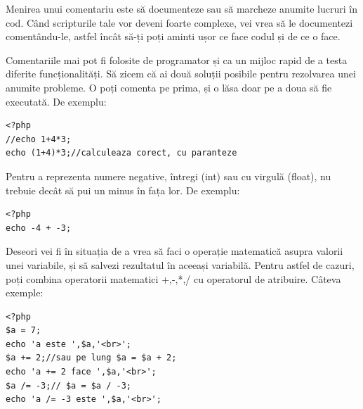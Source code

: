 Menirea unui comentariu este să documenteze sau să marcheze
anumite lucruri în cod. Când scripturile tale vor deveni foarte complexe,
vei vrea să le documentezi comentându-le, astfel încât să-ți
poți aminti ușor ce face codul și de ce o face.


Comentariile mai pot fi folosite de programator
și ca un mijloc rapid de a testa diferite funcționalități.
Să zicem că ai două soluții posibile pentru rezolvarea
unei anumite probleme. O poți comenta pe prima, și
o lăsa doar pe a doua să fie executată. De exemplu:

\begin{lstlisting}
<?php
//echo 1+4*3;
echo (1+4)*3;//calculeaza corect, cu paranteze
\end{lstlisting}

Pentru a reprezenta numere negative, întregi (int)
sau cu virgulă (float), nu trebuie decât să pui un
minus în fața lor. De exemplu:

\begin{lstlisting}
<?php
echo -4 + -3;
\end{lstlisting}

Deseori vei fi în situația de a vrea
să faci o operație matematică
asupra valorii unei variabile,
și să salvezi rezultatul în aceeași variabilă.
Pentru astfel de cazuri, poți combina operatorii
matematici +,-,*,/ cu operatorul de atribuire. Câteva
exemple:
\begin{lstlisting}
<?php
$a = 7;
echo 'a este ',$a,'<br>';
$a += 2;//sau pe lung $a = $a + 2;
echo 'a += 2 face ',$a,'<br>';
$a /= -3;// $a = $a / -3;
echo 'a /= -3 este ',$a,'<br>';
\end{lstlisting}

